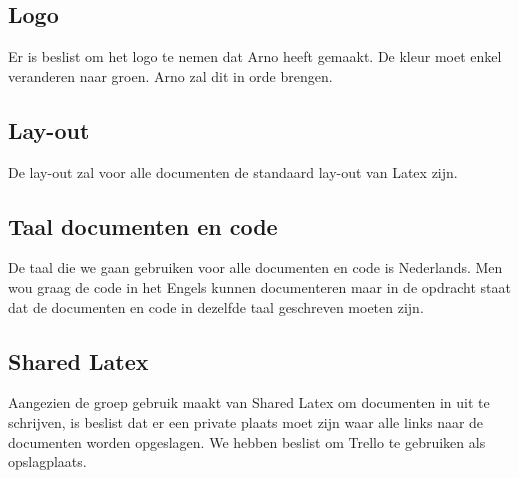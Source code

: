 \subsection{Logo}
Er is beslist om het logo te nemen dat Arno heeft gemaakt. De kleur moet enkel veranderen naar groen. Arno zal dit in orde brengen.

\subsection{Lay-out}
De lay-out zal voor alle documenten de standaard lay-out van Latex zijn. 

\subsection{Taal documenten en code}
De taal die we gaan gebruiken voor alle documenten en code is Nederlands. Men wou graag de code in het Engels kunnen documenteren maar in de opdracht staat dat de documenten en code in dezelfde taal geschreven moeten zijn.

\subsection{Shared Latex}
Aangezien de groep gebruik maakt van Shared Latex om documenten in uit te schrijven, is beslist dat er een private plaats moet zijn waar alle links naar de documenten worden opgeslagen. We hebben beslist om Trello te gebruiken als opslagplaats.

